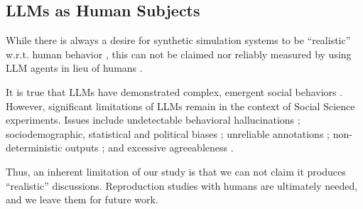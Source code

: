 \subsection{LLMs as Human Subjects}
\label{ssec:related:human-llm}

While there is always a desire for synthetic simulation systems to be ``realistic'' w.r.t. human behavior \citep{grossman_2023, tornberg_2023, argyle2023}, this can not be claimed nor reliably measured by using LLM agents in lieu of humans \citep{rossi_2024}.

It is true that LLMs have demonstrated complex, emergent social behaviors \cite{park2023game, demarzo_2023, leng_2024, abdelnabi_negotiations, abramski_2023, hewitt2024predicting, park2024generativeagentsimulations1000}. However, significant limitations of LLMs remain in the context of Social Science experiments. Issues include undetectable behavioral hallucinations \cite{rossi_2024}; sociodemographic, statistical and political biases \cite{anthis_2025,hewitt2024predicting,rossi_2024, Taubenfeld2024SystematicBI}; unreliable annotations \cite{jansen_2023,bisbee_2023,neumann_2025, Gligoric2024CanUL}; non-deterministic outputs \cite{atil_2025, bisbee_2023}; and excessive agreeableness \cite{Park2023GenerativeAI, anthis_2025, rossi_2024}.

Thus, an inherent limitation of our study is that we can not claim it produces ``realistic'' discussions. Reproduction studies with humans are ultimately needed, and we leave them for future work.